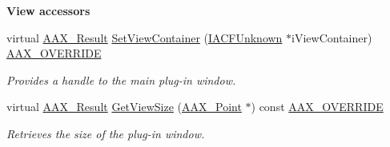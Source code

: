 \begin{Indent}{\bf View accessors}\par
\begin{DoxyCompactItemize}
\item 
virtual \hyperlink{a00149_a4d8f69a697df7f70c3a8e9b8ee130d2f}{A\+A\+X\+\_\+\+Result} \hyperlink{a00017_ab89a75d1ab25d3544a345f1cea70899c}{Set\+View\+Container} (\hyperlink{a00146}{I\+A\+C\+F\+Unknown} $\ast$i\+View\+Container) \hyperlink{a00149_ac2f24a5172689ae684344abdcce55463}{A\+A\+X\+\_\+\+O\+V\+E\+R\+R\+I\+D\+E}
\begin{DoxyCompactList}\small\item\em Provides a handle to the main plug-\/in window. \end{DoxyCompactList}\item 
virtual \hyperlink{a00149_a4d8f69a697df7f70c3a8e9b8ee130d2f}{A\+A\+X\+\_\+\+Result} \hyperlink{a00017_ad64b6e3e31afb065087f4701b5516348}{Get\+View\+Size} (\hyperlink{a00119}{A\+A\+X\+\_\+\+Point} $\ast$) const \hyperlink{a00149_ac2f24a5172689ae684344abdcce55463}{A\+A\+X\+\_\+\+O\+V\+E\+R\+R\+I\+D\+E}
\begin{DoxyCompactList}\small\item\em Retrieves the size of the plug-\/in window. \end{DoxyCompactList}\end{DoxyCompactItemize}
\end{Indent}
